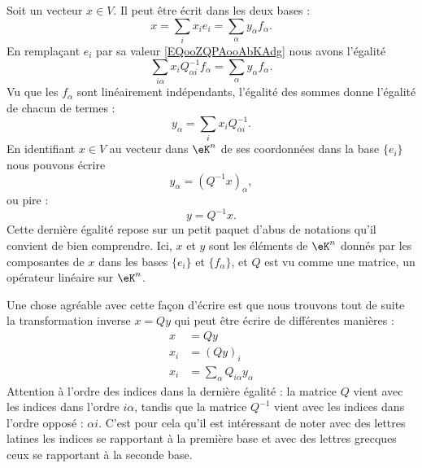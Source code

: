 Soit un vecteur \( x\in V\). Il peut être écrit dans les deux bases :
\begin{equation}
    x=\sum_ix_ie_i=\sum_{\alpha}y_{\alpha}f_{\alpha}.
\end{equation}
En remplaçant \( e_i\) par sa valeur \eqref{EQooZQPAooAbKAdg} nous avons l'égalité
\begin{equation}
    \sum_{i\alpha}x_iQ^{-1}_{\alpha i}f_{\alpha}=\sum_{\alpha}y_{\alpha}f_{\alpha}.
\end{equation}
Vu que les \( f_{\alpha}\) sont linéairement indépendants, l'égalité des sommes donne l'égalité de chacun de termes :
\begin{equation}        \label{EQooFXYLooCRmRdA}
    y_{\alpha}=\sum_ix_iQ^{-1}_{\alpha i}.
\end{equation}
En identifiant \( x\in V\) au vecteur dans \( \eK^n\) de ses coordonnées dans la base \( \{ e_i \}\) nous pouvons écrire
\begin{equation}
    y_{\alpha}=(Q^{-1}x)_{\alpha},
\end{equation}
ou pire : 
\begin{equation}
    y=Q^{-1}x.
\end{equation}
Cette dernière égalité repose sur un petit paquet d'abus de notations qu'il convient de bien comprendre. Ici, \( x\) et \( y\) sont les éléments de \( \eK^n\) donnés par les composantes de \( x\) dans les bases \( \{ e_i \}\) et \( \{ f_{\alpha} \}\), et \( Q\) est vu comme une matrice, un opérateur linéaire sur \( \eK^n\).

Une chose agréable avec cette façon d'écrire est que nous trouvons tout de suite la transformation inverse \( x=Qy\) qui peut être écrire de différentes manières :
\begin{subequations}
    \begin{align}
        x&=Qy\\
        x_i&=(Qy)_i   \label{SUBEQooPVGBooDafCcBk}  \\
        x_i&=\sum_{\alpha}Q_{i\alpha}y_{\alpha}
    \end{align}
\end{subequations}
Attention à l'ordre des indices dans la dernière égalité : la matrice \( Q\) vient avec les indices dans l'ordre \( i\alpha\), tandis que la matrice \( Q^{-1}\) vient avec les indices dans l'ordre opposé : \( \alpha i\). C'est pour cela qu'il est intéressant de noter avec des lettres latines les indices se rapportant à la première base et avec des lettres grecques ceux se rapportant à la seconde base.

